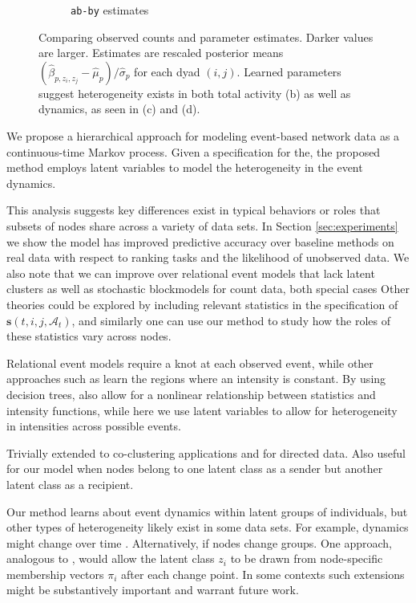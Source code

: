 \begin{figure}[t]
\begin{subfigure}[b]{0.22\textwidth}
\caption{\texttt{ab-by} estimates}
\end{subfigure}
\caption{Comparing observed counts and parameter estimates.  Darker values are larger.  Estimates are rescaled posterior means $(\hat{\beta}_{p,z_i,z_j} - \hat{\mu}_p)/\hat{\sigma}_p$ for each dyad $(i,j)$.  Learned parameters suggest heterogeneity exists in both total activity (b) as well as dynamics, as seen in (c) and (d).}
\label{fig:parmats}
\end{figure}

 We propose a hierarchical approach for modeling event-based network data as a continuous-time Markov process.
Given a specification for the, the proposed method employs latent variables to model the heterogeneity in the event dynamics.

This analysis suggests key differences exist in typical behaviors or roles that subsets of nodes share across a variety of data sets.
In Section \ref{sec:experiments} we show the model has improved predictive accuracy over baseline methods on real data with respect to ranking tasks and the likelihood of unobserved data.
We also note that we can improve over relational event models that lack latent clusters as well as stochastic blockmodels for count data, both special cases 
Other theories could be explored by including relevant statistics in the specification of $\mathbf{s}(t,i,j,\mathcal{A}_t)$, and similarly one can use our method to study how the roles of these statistics vary across nodes.

Relational event models \cite{Butts2008} require a knot at each observed event, while other approaches such as \cite{Gunawardana2011} learn the regions where an intensity is constant.
By using decision trees,  \cite{Gunawardana2011} also allow for a nonlinear relationship between statistics and intensity functions, while here we use latent variables to allow for heterogeneity in intensities across possible events.

Trivially extended to co-clustering applications and for directed data.
Also useful for our model when nodes belong to one latent class as a sender but another latent class as a recipient.

Our method learns about event dynamics within latent groups of individuals, but other types of heterogeneity likely exist in some data sets.
For example, dynamics might change over time \cite{Vu2011}.
Alternatively, if nodes change groups.
One approach, analogous to \cite{Airoldi2008}, would allow the latent class $z_i$ to be drawn from node-specific membership vectors $\pi_i$  after each change point.
In some contexts such extensions might be substantively important and warrant future work.
